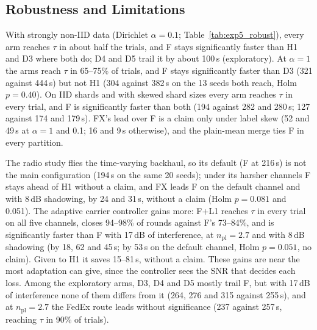 
\subsection{Robustness and Limitations}
\label{sec:res:robust}

With strongly non-IID data (Dirichlet $\alpha=0.1$;
Table~\ref{tab:exp5_robust}), every arm reaches $\tau$ in about half the trials,
and F stays significantly faster than H1 and D3 where both do; D4 and D5 trail it
by about 100\,s (exploratory). At $\alpha=1$ the arms reach $\tau$ in 65--75\% of
trials, and F stays significantly faster than D3 (321 against 444\,s) but not H1
(304 against 382\,s on the 13 seeds both reach, Holm $p=0.40$). On IID shards and
with skewed shard sizes every arm reaches $\tau$ in every trial, and F is
significantly faster than both (194 against 282 and 280\,s; 127 against 174 and
179\,s). FX's lead over F is a claim only under label skew (52 and 49\,s at
$\alpha=1$ and 0.1; 16 and 9\,s otherwise), and the plain-mean merge ties F in
every partition.

The radio study
flies the time-varying backhaul, so its default (F at 216\,s) is not the main
configuration (194\,s on the same 20 seeds); under its harsher channels F stays ahead of H1 without a
claim, and FX leads F on the default channel and with 8\,dB shadowing, by 24 and
31\,s, without a claim (Holm $p=0.081$ and 0.051). The adaptive carrier controller
gains more: F+L1 reaches $\tau$ in every trial on all five channels, closes
94--98\% of rounds against F's 73--84\%, and is significantly faster than F with
17\,dB of interference, at $n_{\text{pl}}=2.7$ and with 8\,dB shadowing (by 18, 62
and 45\,s; by 53\,s on the default channel, Holm $p=0.051$, no claim). Given to H1
it saves 15--81\,s, without a claim. These gains are near the most adaptation can
give, since the controller sees the SNR that decides each loss. Among the exploratory arms, D3, D4 and D5 mostly trail F, but
with 17\,dB of interference none of them differs from it (264, 276 and 315
against 255\,s), and at $n_{\text{pl}}=2.7$ the FedEx route leads without
significance (237 against 257\,s, reaching $\tau$ in 90\% of trials).

